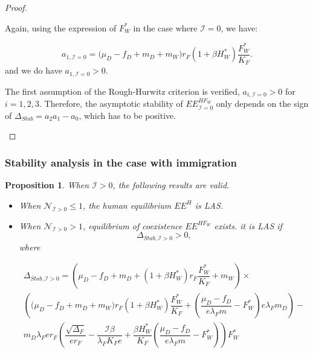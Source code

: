 \documentclass{article}
\newcommand{\lfw}{\lambda_{F}}
\newcommand{\lfw}{\lambda_{F}}
\newcommand{\cI}{\mathcal{I}}
\newtheorem{prop}{Proposition}
\begin{document}
\begin{proof}
\begin{itemize}
Again, using the expression of $F^*_W$ in the case where $\cI = 0$, we have:

\begin{equation*}
a_{1, \cI =0} = \big( \mu_D  -f_D + m_D + m_W) r_F(1+ \beta H_W^*) \dfrac{F^*_W}{K_F} .
\end{equation*}
and we do have $a_{1, \cI =0} > 0$.

The first assumption of the Rough-Hurwitz criterion is verified, $a_{i, \cI =0} > 0$ for $i=1,2,3$. Therefore, the asymptotic stability of $EE^{HF_W}_{\cI =0}$ only depends on the sign of $\Delta_{Stab}= a_2 a_1 - a_0$, which has to be positive. 
\end{itemize}
\end{proof}

\subsubsection{Stability analysis in the case with immigration}

\begin{prop}\label{prop:stab, cI>0} When $\cI > 0$, the following results are valid.
\begin{itemize}
\item When $\mathcal{N}_{\cI > 0} \leq 1$, the human equilibrium $EE^{H}$ is LAS.
\item When $\mathcal{N}_{\cI > 0} > 1$, equilibrium of coexistence $EE^{HF_W}$  exists. it is LAS if 
$$\Delta_{Stab, \cI > 0} > 0,$$  where 

\begin{multline*}
\Delta_{Stab, \cI > 0} = \left(\mu_D -f_D + m_D + (1+\beta H_W^*)r_F \dfrac{F_W^*}{K_F} + m_W  \right) \times \\ \left(\big( \mu_D  -f_D + m_D + m_W) r_F(1+ \beta H_W^*) \dfrac{F^*_W}{K_F} + \left(\dfrac{\mu_D -f_D}{e\lfw m} - F_W^*\right) e \lfw m_D \right) - \\m_D \lfw e r_F \left(\dfrac{\sqrt{\Delta_F}}{er_F} - \dfrac{\cI \beta}{\lfw K_F e} +  \dfrac{\beta H_W^*}{K_F} \left(\dfrac{\mu_D -f_D }{e \lfw m} - F_W^*\right)\right)  F^*_{W}
\end{multline*}
\end{itemize}
\end{prop}
\end{document}
